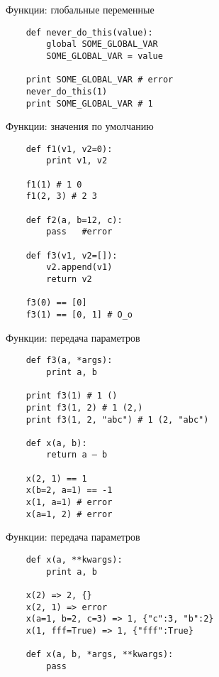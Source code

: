 \documentclass{article}
\begin{document}
{\center Функции: глобальные переменные}
\vspace{15pt}
\begin{lstlisting}
    def never_do_this(value):
        global SOME_GLOBAL_VAR
        SOME_GLOBAL_VAR = value

    print SOME_GLOBAL_VAR # error
    never_do_this(1)
    print SOME_GLOBAL_VAR # 1
\end{lstlisting}
\newpage

{\center Функции: значения по умолчанию}
\vspace{15pt}
\begin{lstlisting}
    def f1(v1, v2=0):
        print v1, v2

    f1(1) # 1 0
    f1(2, 3) # 2 3

    def f2(a, b=12, c):
        pass   #error

    def f3(v1, v2=[]):
        v2.append(v1)
        return v2

    f3(0) == [0]
    f3(1) == [0, 1] # O_o
\end{lstlisting}
\newpage

{\center Функции: передача параметров}
\vspace{15pt}
\begin{lstlisting}
    def f3(a, *args):
        print a, b

    print f3(1) # 1 ()
    print f3(1, 2) # 1 (2,)
    print f3(1, 2, "abc") # 1 (2, "abc")

    def x(a, b):
        return a – b

    x(2, 1) == 1
    x(b=2, a=1) == -1
    x(1, a=1) # error
    x(a=1, 2) # error
\end{lstlisting}
\newpage

{\center Функции: передача параметров}
\vspace{15pt}
\begin{lstlisting}
    def x(a, **kwargs):
        print a, b

    x(2) => 2, {}
    x(2, 1) => error
    x(a=1, b=2, c=3) => 1, {"c":3, "b":2}
    x(1, fff=True) => 1, {"fff":True}

    def x(a, b, *args, **kwargs):
        pass
\end{lstlisting}
\newpage
\end{document}
